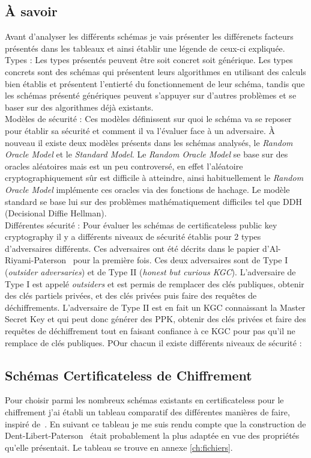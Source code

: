\subsection{À savoir}
Avant d'analyser les différents schémas je vais présenter les différenets facteurs présentés dans les tableaux et ainsi établir une légende de ceux-ci expliquée.\\
Types : Les types présentés peuvent être soit concret soit générique. Les types concrets sont des schémas qui présentent leurs algorithmes en utilisant des calculs bien établis et présentent l'entierté du fonctionnement de leur schéma, tandis que les schémas présenté génériques peuvent s'appuyer sur d'autres problèmes et se baser sur des algorithmes déjà existants.\\
Modèles de sécurité : Ces modèles définissent sur quoi le schéma va se reposer pour établir sa sécurité et comment il va l'évaluer face à un adversaire. À nouveau il existe deux modèles présents dans les schémas analysés, le \textit{Random Oracle Model} et le \textit{Standard Model}. Le \textit{Random Oracle Model} se base sur des oracles aléatoires mais est un peu controversé, en effet l'aléatoire cryptographiquement sûr est difficile à atteindre, ainsi habituellement le \textit{Random Oracle Model} implémente ces oracles via des fonctions de hachage. Le modèle standard se base lui sur des problèmes mathématiquement difficiles tel que DDH (Decisional Diffie Hellman). \\
Différentes sécurité : Pour évaluer les schémas de certificateless public key cryptography il y a différents niveaux de sécurité établis pour 2 types d'adversaires différents. Ces adversaires ont été décrits dans le papier d'Al-Riyami-Paterson~\cite{DBLP:conf/asiacrypt/Al-RiyamiP03} pour la première fois. Ces deux adversaires sont de Type I (\textit{outsider adversaries}) et de Type II (\textit{honest but curious KGC}). L'adversaire de Type I est appelé \textit{outsiders} et est permis de remplacer des clés publiques, obtenir des clés partiels privées, et des clés privées puis faire des requêtes de déchiffrements. L'adversaire de Type II est en fait un KGC connaissant la Master Secret Key et qui peut donc générer des PPK, obtenir des clés privées et faire des requêtes de déchiffrement tout en faisant confiance à ce KGC pour pas qu'il ne remplace de clés publiques. POur chacun il existe différents niveaux de sécurité : \\
\subsection{Schémas Certificateless de Chiffrement}
Pour choisir parmi les nombreux schémas existants en certificateless pour le chiffrement j'ai établi un tableau comparatif des différentes manières de faire, inspiré de~\cite{bookIntroCertificateless}. En suivant ce tableau je me suis rendu compte que la construction de Dent-Libert-Paterson~\cite{DBLP:conf/pkc/DentLP08} était probablement la plus adaptée en vue des propriétés qu'elle présentait. Le tableau se trouve en annexe \ref{ch:fichiers}.


